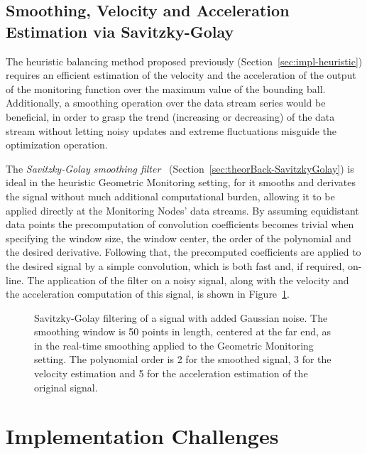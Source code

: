 \subsection{Smoothing, Velocity and Acceleration Estimation via Savitzky-Golay} \label{subsec:impl-heuristic-vel}

The heuristic balancing method proposed previously (Section~\ref{sec:impl-heuristic}) requires an efficient estimation of the velocity and the acceleration of the output of the monitoring function over the maximum value of the bounding ball. Additionally, a smoothing operation over the data stream series would be beneficial, in order to grasp the trend (increasing or decreasing) of the data stream without letting noisy updates and extreme fluctuations misguide the optimization operation. 

The \emph{Savitzky-Golay smoothing filter}~\cite{SavGol1964SmoothDiff} (Section~\ref{sec:theorBack-SavitzkyGolay}) is ideal in the heuristic Geometric Monitoring setting, for it smooths and derivates the signal without much additional computational burden, allowing it to be applied directly at the Monitoring Nodes' data streams. By assuming equidistant data points the precomputation of convolution coefficients becomes trivial when specifying the window size, the window center, the order of the polynomial and the desired derivative. Following that, the precomputed coefficients are applied to the desired signal by a simple convolution, which is both fast and, if required, on-line. The application of the filter on a noisy signal, along with the velocity and the acceleration computation of this signal, is shown in Figure~\ref{fig:savgol}.



\begin{figure}
\centering
\caption{Savitzky-Golay filtering of a signal with added Gaussian noise. The smoothing window is 50 points in length, centered at the far end, as in the real-time smoothing applied to the Geometric Monitoring setting. The polynomial order is 2 for the smoothed signal, 3 for the velocity estimation and 5 for the acceleration estimation of the original signal.} 
\label{fig:savgol}
\end{figure}

\section{Implementation Challenges} \label{sec:impl-implChallenges}

